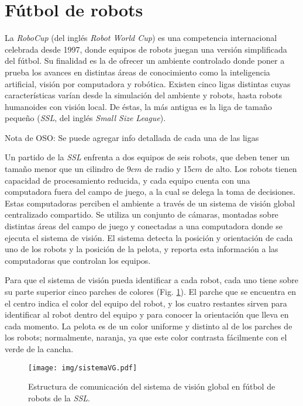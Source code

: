 
\section{Fútbol de robots}

La \emph{RoboCup}\cite{robocupHist} (del inglés \emph{Robot World Cup}) es una
competencia internacional celebrada desde 1997, donde equipos de robots juegan
una versión simplificada del fútbol. Su finalidad es la de ofrecer un ambiente
controlado donde poner a prueba los avances en distintas áreas de conocimiento
como la inteligencia artificial, visión por computadora y robótica. Existen
cinco ligas distintas cuyas características varían desde la simulación del
ambiente y robots, hasta robots humanoides con visión local. De éstas, la más
antigua es la liga de tamaño pequeño (\emph{SSL}, del inglés \emph{Small Size
League}).

Nota de OSO: Se puede agregar info detallada de cada una de las ligas

Un partido de la \emph{SSL} enfrenta a dos equipos de seis robots, que deben
tener un tamaño menor que un cilindro de 9$cm$ de radio y 15$cm$ de
alto\cite{sslrules2015}. Los robots tienen capacidad de procesamiento reducida,
y cada equipo cuenta con una computadora fuera del campo de juego, a la cual se
delega la toma de decisiones. Estas computadoras perciben el ambiente a través
de un sistema de visión global centralizado compartido. Se utiliza un conjunto
de cámaras, montadas sobre distintas áreas del campo de juego y conectadas a una
computadora donde se ejecuta el sistema de visión. El sistema detecta la
posición y orientación de cada uno de los robots y la posición de la pelota, y
reporta esta información a las computadoras que controlan los equipos.

Para que el sistema de visión pueda identificar a cada robot, cada uno tiene
sobre su parte superior cinco parches de colores (Fig. \ref{sistemaVG}). El
parche que se encuentra en el centro indica el color del equipo del robot, y los
cuatro restantes sirven para identificar al robot dentro del equipo y para
conocer la orientación que lleva en cada momento. La pelota es de un color
uniforme y distinto al de los parches de los robots; normalmente, naranja, ya
que este color contrasta fácilmente con el verde de la cancha.

\begin{figure}[!h]

	\texttt{[image: img/sistemaVG.pdf]}

	\caption{Estructura de comunicación del sistema de visión global en
	fútbol de robots de la \emph{SSL}.}

	\label{sistemaVG}

\end{figure}

